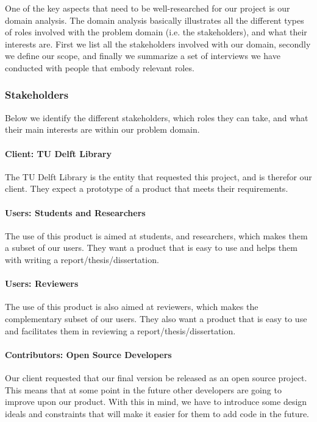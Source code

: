 One of the key aspects that need to be well-researched for our project is our domain analysis. The domain analysis basically illustrates all the different types of roles involved with the problem domain (i.e. the stakeholders), and what their interests are. First we list all the stakeholders involved with our domain, secondly we define our scope, and finally we summarize a set of interviews we have conducted with people that embody relevant roles.

\subsubsection{Stakeholders} %

Below we identify the different stakeholders, which roles they can take, and what their main interests are within our problem domain.

\paragraph{Client: TU Delft Library} The TU Delft Library is the entity that requested this project, and is therefor our client. They expect a prototype of a product that meets their requirements.

\paragraph{Users: Students and Researchers} The use of this product is aimed at students, and researchers, which makes them a subset of our users. They want a product that is easy to use and helps them with writing a report/thesis/dissertation.

\paragraph{Users: Reviewers} The use of this product is also aimed at reviewers, which makes the complementary subset of our users. They also want a product that is easy to use and facilitates them in reviewing a report/thesis/dissertation.

\paragraph{Contributors: Open Source Developers} Our client requested that our final version be released as an open source project. This means that at some point in the future other developers are going to improve upon our product. With this in mind, we have to introduce some design ideals and constraints that will make it easier for them to add code in the future.

